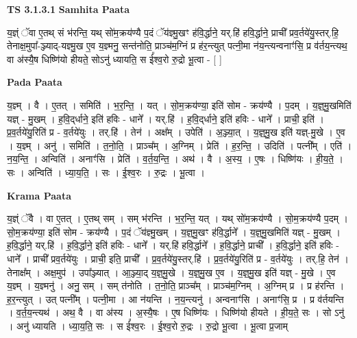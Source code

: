 \documentclass[17pt]{extarticle}
\begin{document}
\textbf{TS 3.1.3.1 } \newline
\textbf{Samhita Paata} \newline

य॒ज्ञ्ं ॅवा ए॒तथ् सं भ॑रन्ति॒ यथ् सो॑म॒क्रय॑ण्यै प॒दं ॅय॑ज्ञ्मु॒खꣳ ह॑वि॒र्द्धाने॒ यर्.हि॑ हवि॒र्द्धाने॒ प्राची᳚ प्रव॒र्तये॑यु॒स्तर्.हि॒ तेनाक्ष॒मुपा᳚-ञ्ज्याद्-यज्ञ्मु॒ख ए॒व य॒ज्ञ्मनु॒ सन्त॑नोति॒ प्राञ्च॑म॒ग्निं प्र ह॑र॒न्त्युत् पत्नी॒मा न॑य॒न्त्यन्वनाꣳ॑सि॒ प्र व॑र्तय॒न्त्यथ॒ वा अ॑स्यै॒ष धिष्णि॑यो हीयते॒ सोऽनु॑ ध्यायति॒ स ई᳚श्व॒रो रु॒द्रो भू॒त्वा - [  ] \newline

\textbf{Pada Paata} \newline

य॒ज्ञ्म् । वै । ए॒तत् । समिति॑ । भ॒र॒न्ति॒ । यत् । सो॒म॒क्रय॑ण्या॒ इति॑ सोम - क्रय॑ण्यै । प॒दम् । य॒ज्ञ्॒मु॒खमिति॑ यज्ञ् - मु॒खम् । ह॒वि॒द्‌र्धाने॒ इति॑ हविः - धाने᳚ । यर्.हि॑ । ह॒वि॒द्‌र्धाने॒ इति॑ हविः - धाने᳚ । प्राची॒ इति॑ । प्र॒व॒र्तये॑यु॒रिति॑ प्र - व॒र्तये॑युः । तर्.हि॑ । तेन॑ । अक्ष᳚म् । उपेति॑ । अ॒ञ्ज्या॒त् । य॒ज्ञ्॒मु॒ख इति॑ यज्ञ्-मु॒खे । ए॒व । य॒ज्ञ्म् । अनु॑ । समिति॑ । त॒नो॒ति॒ । प्राञ्च᳚म् । अ॒ग्निम् । प्रेति॑ । ह॒र॒न्ति॒ । उदिति॑ । पत्नी᳚म् । एति॑ । न॒य॒न्ति॒ । अन्विति॑ । अनाꣳ॑सि । प्रेति॑ । व॒र्त॒य॒न्ति॒ । अथ॑ । वै । अ॒स्य॒ । ए॒षः । धिष्णि॑यः । ही॒य॒ते॒ । सः । अन्विति॑ । ध्या॒य॒ति॒ । सः । ई॒श्व॒रः । रु॒द्रः । भू॒त्वा ।  \newline


\textbf{Krama Paata} \newline

य॒ज्ञ्ं ॅवै । वा ए॒तत् । ए॒तथ् सम् । सम् भ॑रन्ति । भ॒र॒न्ति॒ यत् । यथ् सो॑म॒क्रय॑ण्यै । सो॒म॒क्रय॑ण्यै प॒दम् । सो॒म॒क्रय॑ण्या॒ इति॑ सोम - क्रय॑ण्यै । प॒दं ॅय॑ज्ञ्मु॒खम् । य॒ज्ञ्॒मु॒खꣳ ह॑वि॒र्द्धाने᳚ । य॒ज्ञ्॒मु॒खमिति॑ यज्ञ् - मु॒खम् । ह॒वि॒र्द्धाने॒ यर्.हि॑ । ह॒वि॒र्द्धाने॒ इति॑ हविः - धाने᳚ । यर्.हि॑ हवि॒र्द्धाने᳚ । ह॒वि॒र्द्धाने॒ प्राची᳚ । ह॒वि॒र्द्धाने॒ इति॑ हविः - धाने᳚ । प्राची᳚ प्रव॒र्तये॑युः । प्राची॒ इति॒ प्राची᳚ । प्र॒व॒र्तये॑यु॒स्तर्.हि॑ । प्र॒व॒र्तये॑यु॒रिति॑ प्र - व॒र्तये॑युः । तर्.हि॒ तेन॑ । तेनाक्ष᳚म् । अक्ष॒मुप॑ । उपा᳚ञ्ज्यात् । आ॒ञ्ज्या॒द् य॒ज्ञ्॒मु॒खे । य॒ज्ञ्॒मु॒ख ए॒व । य॒ज्ञ्॒मु॒ख इति॑ यज्ञ् - मु॒खे । ए॒व य॒ज्ञ्म् । य॒ज्ञ्मनु॑ । अनु॒ सम् । सम् त॑नोति । त॒नो॒ति॒ प्राञ्च᳚म् । प्राञ्च॑म॒ग्निम् । अ॒ग्निम् प्र । प्र ह॑रन्ति । ह॒र॒न्त्युत् । उत् पत्नी᳚म् । पत्नी॒मा । आ न॑यन्ति । न॒य॒न्त्यनु॑ । अन्वनाꣳ॑सि । अनाꣳ॑सि॒ प्र । प्र व॑र्तयन्ति । व॒र्त॒य॒न्त्यथ॑ । अथ॒ वै । वा अ॑स्य । अ॒स्यै॒षः । ए॒ष धिष्णि॑यः । धिष्णि॑यो हीयते । ही॒य॒ते॒ सः । सो ऽनु॑ । अनु॑ ध्यायति । ध्या॒य॒ति॒ सः । स ई᳚श्व॒रः । ई॒श्व॒रो रु॒द्रः । रु॒द्रो भू॒त्वा । भू॒त्वा प्र॒जाम् \newline
\end{document}
